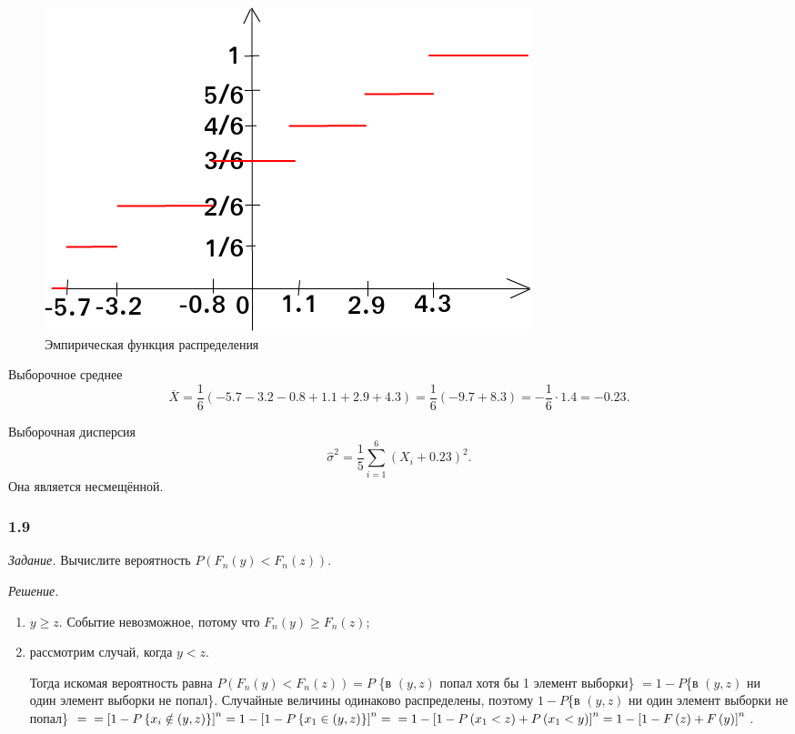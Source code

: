 \begin{figure}[h!]
  \centering
  \includegraphics[width=.4\textwidth]{./pictures/1_8.png}
  \caption{Эмпирическая функция распределения}
  \label{fig:18}
\end{figure}

Выборочное среднее
$$ \overline{X} =
  \frac{1}{6} \left( -5.7 -3.2 - 0.8 + 1.1 + 2.9 + 4.3 \right) =
  \frac{1}{6} \left( -9.7 + 8.3 \right) =
  - \frac{1}{6} \cdot 1.4 =
  -0.23.$$

Выборочная дисперсия
$$ \hat{ \sigma }^2 =
  \frac{1}{5} \sum \limits_{i = 1}^6 \left( X_i + 0.23 \right)^2.$$
Она является несмещённой.

\subsubsection*{1.9}

\textit{Задание.}
Вычислите вероятность $P \left( F_n \left( y \right) < F_n \left( z \right) \right) $.

\textit{Решение.}
\begin{enumerate}[label=\alph*)]
  \item $y \geq z$.
  Событие невозможное, потому что $F_n \left( y \right) \geq F_n \left( z \right) $;
  \item рассмотрим случай, когда $y < z$.

  Тогда искомая вероятность равна
  $P \left( F_n \left( y \right) < F_n \left( z \right) \right) = P$
  \{в $ \left( y, z \right) $ попал хотя бы 1 элемент выборки\}
  $= 1 - P$\{в $ \left( y, z \right) $ ни один элемент выборки не попал\}.
  Случайные величины одинаково распределены,
  поэтому $1 - P$\{в $ \left( y, z \right) $ ни один элемент выборки не попал\} $= \\
  = \left[ 1 - P \left\{ x_i \notin \left( y, z \right) \right\} \right]^n =
  1 - \left[ 1 - P \left\{ x_1 \in \left( y, z \right) \right\} \right]^n = \\
  = 1 - \left[ 1 - P \left( x_1 < z \right) + P \left( x_1 < y \right) \right]^n =
  1 - \left[ 1 - F \left( z \right) + F \left( y \right) \right]^n$.
\end{enumerate}

